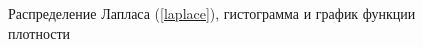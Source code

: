\documentclass[12pt,a4paper]{article}
\begin{document}
\begin{figure}[h!]
\begin{minipage}[h]{0.3\linewidth}
		\end{minipage}
		\caption{Распределение Лапласа (\ref{laplace}), гистограмма и график функции плотности}
		\label{ris:laplace}
	\end{figure}
	
\end{document}
